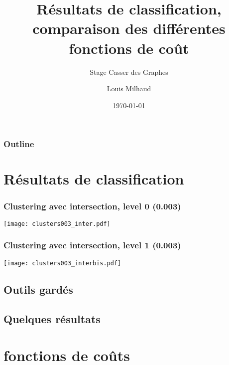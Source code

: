 \documentclass[aspectratio=169]{beamer}
\title{Résultats de classification, comparaison des différentes fonctions de coût}
\subtitle{Stage Casser des Graphes}
\author{Louis Milhaud}
\institute{Complex Networks - LIP6}
\date{\today}
\begin{document}
    \begin{frame}
        \titlepage
    \end{frame}

    \begin{frame}
        \frametitle{Outline}
        \tableofcontents
    \end{frame}

    \section{Résultats de classification}
    \begin{frame}
        \frametitle{Clustering avec intersection, level 0 (0.003)}
        \centering
        \texttt{[image: clusters003\_inter.pdf]}
    
    \end{frame}
    
    \begin{frame}
        \frametitle{Clustering avec intersection, level 1 (0.003)}
        \centering
        \texttt{[image: clusters003\_interbis.pdf]}
    
    \end{frame}
    
    \subsection{Outils gardés}
    \subsection{Quelques résultats}
    \section{fonctions de coûts}
    
\end{document}
